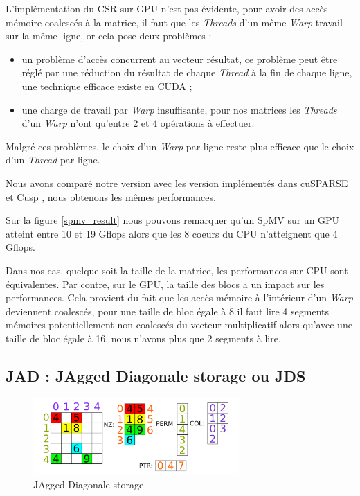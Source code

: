 \documentclass[renpar]{compas2013}
\begin{document}
    L'implémentation du CSR sur GPU n'est pas évidente, pour avoir des accès mémoire coalescés
    à la matrice, il faut que les \textit{Threads} d'un même \textit{Warp} travail sur la même ligne, or cela
    pose deux problèmes :
    \begin{itemize}
      \item un problème d'accès concurrent au vecteur résultat, ce problème peut être réglé par une
        réduction du résultat de chaque \textit{Thread} à la fin de chaque ligne, une technique efficace existe
        en CUDA \cite{HarrisReductionCUDA} ;
      \item une charge de travail par \textit{Warp} insuffisante, pour nos matrices les
        \textit{Threads} d'un \textit{Warp} n'ont qu'entre 2 et 4 opérations à effectuer.
    \end{itemize}
    Malgré ces problèmes, le choix d'un \textit{Warp} par ligne reste plus efficace que le choix d'un
    \textit{Thread} par ligne.

    Nous avons comparé notre version avec les version implémentés dans
    cuSPARSE \cite{cuSPARSE} et Cusp \cite{Cusp}, nous obtenons les mêmes
    performances.
    

    Sur la figure \ref{spmv_result} nous pouvons remarquer qu'un SpMV sur un GPU atteint
    entre 10 et 19 Gflops alors que les 8 coeurs du CPU n'atteignent que 4 Gflops.

    
    Dans nos cas, quelque soit la taille de la matrice, les performances sur CPU sont
    équivalentes. Par contre, sur le GPU, la taille des blocs a un impact sur les performances.
    Cela provient du fait que les accès mémoire à l'intérieur d'un \textit{Warp} deviennent coalescés,
    pour une taille de bloc égale à 8 il faut lire 4 segments mémoires potentiellement non coalescés du vecteur
    multiplicatif alors qu'avec une taille de bloc égale à 16, nous n'avons plus que 2 segments à lire.
        
    
    \subsection{JAD : JAgged Diagonale storage ou JDS}
    \begin{figure}\begin{center}
        \includegraphics[width=0.7\textwidth]{images/JAD.pdf}
        \caption{JAgged Diagonale storage}
        \label{jad_info}
    \end{center}\end{figure}
 
\end{document}
